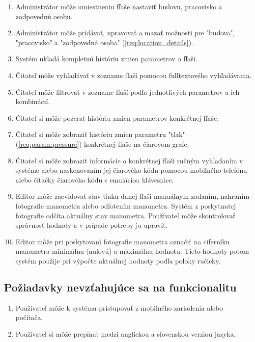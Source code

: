 \documentclass{zah}
\begin{document}
\begin{enumerate}
\item \label{req:location_details} Administrátor môže umiestneniu fľaše nastaviť budovu, pracovisko a zodpovednú osobu.
\item Administrátor môže pridávať, upravovať a mazať možnosti pre "budova", "pracovisko" a "zodpovedná osoba" (\ref{req:location_details}).
\item \label{req:history} Systém ukladá kompletnú históriu zmien parametrov o fľaši.
\item Čitateľ môže vyhľadávať v zozname fľaší pomocou fulltextového vyhľadávania.
\item Čitateľ môže filtrovať v zozname fľaší podľa jednotlivých parametrov a ich kombinácií.
\item Čitateľ si môže pozerať históriu zmien parametrov konkrétnej fľaše.
\item Čitateľ si môže zobraziť históriu zmien parametru "tlak" (\ref{req:param:pressure}) konkrétnej fľaše na čiarovom grafe.
\item Čitateľ si môže zobraziť informácie o konkrétnej fľaši ručným vyhľadaním v systéme alebo naskenovaním jej čiarového kódu pomocou mobilného telefónu alebo čítačky čiarového kódu s emuláciou klávesnice.
\item Editor môže zaevidovať stav tlaku danej fľaši manuálnym zadaním, nahraním fotografie manometra alebo odfotením manometra.
Systém z poskytnutej fotografie odčíta aktuálny stav manometra. Používateľ môže skontrolovať správnosť hodnoty a v prípade potreby ju upraviť.
\item Editor môže pri poskytovaní fotografie manometra označiť na ciferníku manometra minimálnu (nulovú) a maximálnu hodnotu. Tieto hodnoty potom systém použije pri výpočte aktuálnej hodnoty podľa polohy ručicky.
\end{enumerate}

\subsection{Požiadavky nevzťahujúce sa na funkcionalitu}

\begin{enumerate}
\item Používateľ môže k systému pristupovať z mobilného zariadenia alebo počítača.
\item Používateľ si môže prepínať medzi anglickou a slovenskou verziou jazyka.
\end{enumerate}


\end{document}

